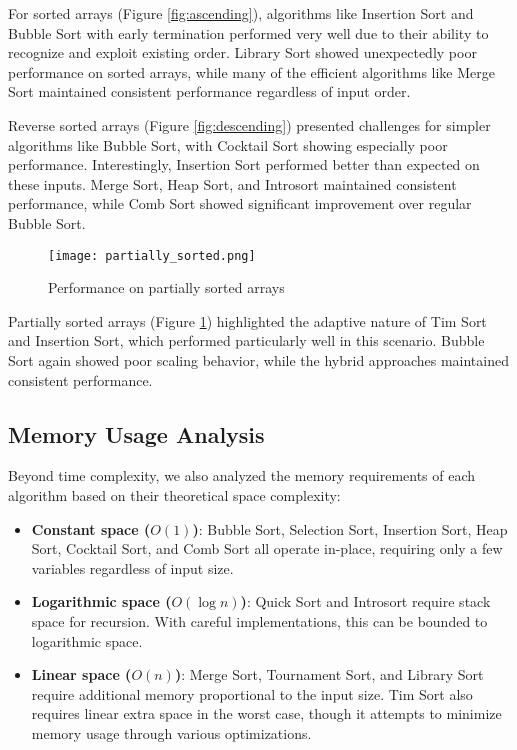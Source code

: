 \documentclass[sigconf]{acmart}
\begin{document}
For sorted arrays (Figure \ref{fig:ascending}), algorithms like Insertion Sort and Bubble Sort with early termination performed very well due to their ability to recognize and exploit existing order. Library Sort showed unexpectedly poor performance on sorted arrays, while many of the efficient algorithms like Merge Sort maintained consistent performance regardless of input order.

Reverse sorted arrays (Figure \ref{fig:descending}) presented challenges for simpler algorithms like Bubble Sort, with Cocktail Sort showing especially poor performance. Interestingly, Insertion Sort performed better than expected on these inputs. Merge Sort, Heap Sort, and Introsort maintained consistent performance, while Comb Sort showed significant improvement over regular Bubble Sort.

\begin{figure}[h]
  \centering
  \texttt{[image: partially\_sorted.png]}
  \caption{Performance on partially sorted arrays}
  \label{fig:partially}
\end{figure}

Partially sorted arrays (Figure \ref{fig:partially}) highlighted the adaptive nature of Tim Sort and Insertion Sort, which performed particularly well in this scenario. Bubble Sort again showed poor scaling behavior, while the hybrid approaches maintained consistent performance.

\subsection{Memory Usage Analysis}
Beyond time complexity, we also analyzed the memory requirements of each algorithm based on their theoretical space complexity:

\begin{itemize}
  \item \textbf{Constant space ($O(1)$)}: Bubble Sort, Selection Sort, Insertion Sort, Heap Sort, Cocktail Sort, and Comb Sort all operate in-place, requiring only a few variables regardless of input size.
  
  \item \textbf{Logarithmic space ($O(\log n)$)}: Quick Sort and Introsort require stack space for recursion. With careful implementations, this can be bounded to logarithmic space.
  
  \item \textbf{Linear space ($O(n)$)}: Merge Sort, Tournament Sort, and Library Sort require additional memory proportional to the input size. Tim Sort also requires linear extra space in the worst case, though it attempts to minimize memory usage through various optimizations.
\end{itemize}
\end{document}
